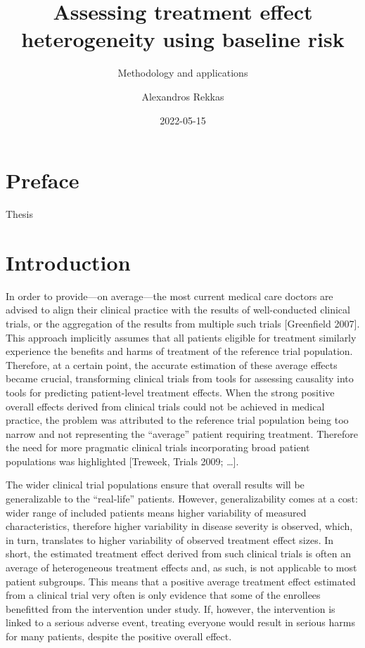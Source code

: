 \documentclass[
]{book}
\title{Assessing treatment effect heterogeneity using baseline risk}
\subtitle{Methodology and applications}
\author{Alexandros Rekkas}
\date{2022-05-15}
\begin{document}
\maketitle

{
\setcounter{tocdepth}{1}
\tableofcontents
}
\hypertarget{preface}{%
\chapter*{Preface}\label{preface}}

Thesis

\hypertarget{introduction}{%
\chapter*{Introduction}\label{introduction}}

In order to provide---on average---the most current medical care doctors are
advised to align their clinical practice with the results of well-conducted
clinical trials, or the aggregation of the results from multiple such trials
{[}Greenfield 2007{]}. This approach implicitly assumes that all patients eligible
for treatment similarly experience the benefits and harms of treatment of the
reference trial population. Therefore, at a certain point, the accurate
estimation of these average effects became crucial, transforming clinical trials
from tools for assessing causality into tools for predicting patient-level
treatment effects. When the strong positive overall effects derived from
clinical trials could not be achieved in medical practice, the problem was
attributed to the reference trial population being too narrow and not
representing the ``average'' patient requiring treatment. Therefore the need for
more pragmatic clinical trials incorporating broad patient populations was
highlighted {[}Treweek, Trials 2009; \ldots{]}.

The wider clinical trial populations ensure that overall results will be
generalizable to the ``real-life'' patients. However, generalizability comes at a
cost: wider range of included patients means higher variability of measured
characteristics, therefore higher variability in disease severity is observed,
which, in turn, translates to higher variability of observed treatment effect
sizes. In short, the estimated treatment effect derived from such clinical
trials is often an average of heterogeneous treatment effects and, as such, is
not applicable to most patient subgroups. This means that a positive average
treatment effect estimated from a clinical trial very often is only evidence
that some of the enrollees benefitted from the intervention under study. If,
however, the intervention is linked to a serious adverse event, treating
everyone would result in serious harms for many patients, despite the positive
overall effect.
\end{document}
